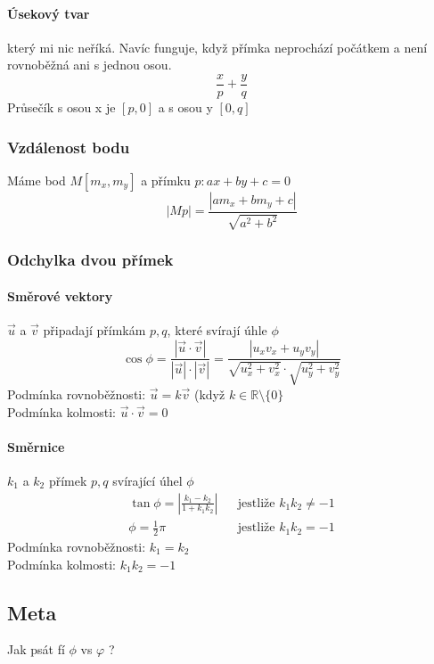 \documentclass[12pt]{article}
\begin{document}
\paragraph{Úsekový tvar} který mi nic neříká. Navíc funguje, když přímka neprochází počátkem a není rovnoběžná ani s jednou osou.
\begin{equation}
\frac{x}{p} + \frac{y}{q}
\end{equation}
Průsečík s osou x je $[p,0]$ a s osou y $[0,q]$
\subsubsection{Vzdálenost bodu}
Máme bod $M[m_x,m_y]$ a přímku $p: ax + by +c =0$
\begin{equation}
|Mp| = \frac{\left| a m_x + b m_y + c\right|}{\sqrt{a^2 + b^2}}
\end{equation}
\subsubsection{Odchylka dvou přímek}
\paragraph{Směrové vektory} $\vec{u}$ a $\vec{v}$ připadají přímkám $p,q$, které svírají úhle $\phi$
\begin{equation}
\cos \phi = \frac{|\vec{u} \cdot \vec{v}|}{|\vec{u}| \cdot |\vec{v}|} = \frac{\left|u_x v_x + u_y v_y \right|}{\sqrt{u_x^2 + v_x^2} \cdot \sqrt{u_y^2 + v_y^2}}
\end{equation}
Podmínka rovnoběžnosti: $\vec{u} = k \vec{v}$ (když $k \in \mathbb{R} \setminus \{ 0 \}$\\
Podmínka kolmosti: $\vec{u} \cdot \vec{v} = 0$
\paragraph{Směrnice} $k_1$ a $k_2$ přímek $p,q$ svírající úhel $\phi$
\begin{align}
\tan \phi = \left| \frac{k_1-k_2}{1+k_1 k_2}\right| && \text{jestliže }k_1 k_2 \neq -1 \\
\phi = \frac{1}{2}\pi  && \text{jestliže }k_1 k_2 =  -1
\end{align}
Podmínka rovnoběžnosti: $k_1 =k_2$\\
Podmínka kolmosti: $k_1 k_2 = -1$
\subsection{Meta}
Jak psát fí $\phi$ vs $\varphi$ ?
\end{document}
